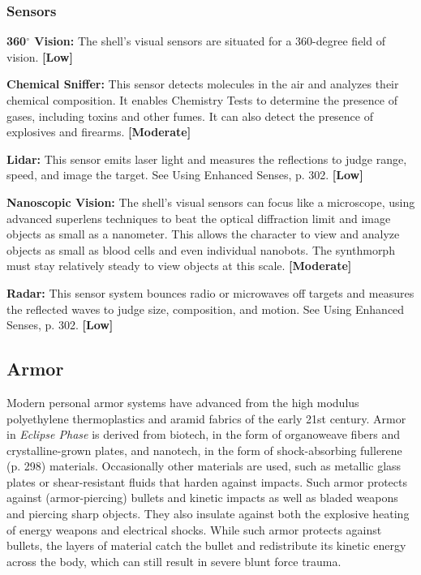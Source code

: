 \subsubsection{Sensors}

\textbf{360$^{\circ}$ Vision:} The shell’s visual sensors are situated for a 360-degree field of vision. \textbf{[Low]}

\textbf{Chemical Sniffer:} This sensor detects molecules in the air and analyzes their chemical composition. It enables Chemistry Tests to determine the presence of gases, including toxins and other fumes. It can also detect the presence of explosives and firearms. \textbf{[Moderate]}

\textbf{Lidar:} This sensor emits laser light and measures the reflections to judge range, speed, and image the target. See Using Enhanced Senses, p. 302. \textbf{[Low]}

\textbf{Nanoscopic Vision:} The shell’s visual sensors can focus like a microscope, using advanced superlens techniques to beat the optical diffraction limit and image objects as small as a nanometer. This allows the character to view and analyze objects as small as blood cells and even individual nanobots. The synthmorph must stay relatively steady to view objects at this scale. \textbf{[Moderate]}

\textbf{Radar:} This sensor system bounces radio or microwaves off targets and measures the reflected waves to judge size, composition, and motion. See Using Enhanced Senses, p. 302. \textbf{[Low]}

\subsection{Armor}
\label{sec:armor}

Modern personal armor systems have advanced from the high modulus polyethylene thermoplastics and aramid fabrics of the early 21st century. Armor in \emph{Eclipse Phase} is derived from biotech, in the form of organoweave fibers and crystalline-grown plates, and nanotech, in the form of shock-absorbing fullerene (p. 298) materials. Occasionally other materials are used, such as metallic glass plates or shear-resistant fluids that harden against impacts. Such armor protects against (armor-piercing) bullets and kinetic impacts as well as bladed weapons and piercing sharp objects. They also insulate against both the explosive heating of energy weapons and electrical shocks. While such armor protects against bullets, the layers of material catch the bullet and redistribute its kinetic energy across the body, which can still result in severe blunt force trauma.

